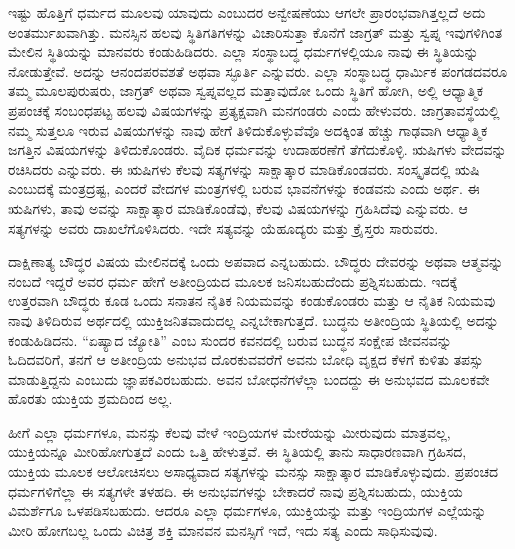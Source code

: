 ಇಷ್ಟು ಹೊತ್ತಿಗೆ ಧರ್ಮದ ಮೂಲವು ಯಾವುದು ಎಂಬುದರ ಅನ್ವೇಷಣೆಯು ಆಗಲೇ ಪ್ರಾರಂಭವಾಗಿತ್ತಲ್ಲದೆ ಅದು ಅಂತರ್ಮುಖವಾಗಿತ್ತು. ಮನಸ್ಸಿನ ಹಲವು ಸ್ಥಿತಿಗತಿಗಳನ್ನು ವಿಚಾರಿಸುತ್ತಾ ಕೊನೆಗೆ ಜಾಗ್ರತ್​ ಮತ್ತು ಸ್ವಪ್ನ ಇವುಗಳಿಗಿಂತ ಮೇಲಿನ ಸ್ಥಿತಿಯನ್ನು ಮಾನವರು ಕಂಡುಹಿಡಿದರು. ಎಲ್ಲಾ ಸಂಸ್ಥಾಬದ್ಧ ಧರ್ಮಗಳಲ್ಲಿಯೂ ನಾವು ಈ ಸ್ಥಿತಿಯನ್ನು ನೋಡುತ್ತೇವೆ. ಅದನ್ನು ಆನಂದಪರವಶತೆ ಅಥವಾ ಸ್ಫೂರ್ತಿ ಎನ್ನುವರು. ಎಲ್ಲಾ ಸಂಸ್ಥಾಬದ್ಧ ಧಾರ್ಮಿಕ ಪಂಗಡದವರೂ ತಮ್ಮ ಮೂಲಪುರುಷರು, ಜಾಗ್ರತ್​ ಅಥವಾ ಸ್ವಪ್ನವಲ್ಲದ ಮತ್ತಾವುದೋ ಒಂದು ಸ್ಥಿತಿಗೆ ಹೋಗಿ, ಅಲ್ಲಿ ಆಧ್ಯಾತ್ಮಿಕ ಪ್ರಪಂಚಕ್ಕೆ ಸಂಬಂಧಪಟ್ಟ ಹಲವು ವಿಷಯಗಳನ್ನು ಪ್ರತ್ಯಕ್ಷವಾಗಿ ಮನಗಂಡರು ಎಂದು ಹೇಳುವರು. ಜಾಗ್ರತಾವಸ್ಥೆಯಲ್ಲಿ ನಮ್ಮ ಸುತ್ತಲೂ ಇರುವ ವಿಷಯಗಳನ್ನು ನಾವು ಹೇಗೆ ತಿಳಿದುಕೊಳ್ಳುವೆವೊ ಅದಕ್ಕಿಂತ ಹೆಚ್ಚು ಗಾಢವಾಗಿ ಆಧ್ಯಾತ್ಮಿಕ ಜಗತ್ತಿನ ವಿಷಯಗಳನ್ನು ತಿಳಿದುಕೊಂಡರು. ವೈದಿಕ ಧರ್ಮವನ್ನು ಉದಾಹರಣೆಗೆ ತೆಗೆದುಕೊಳ್ಳಿ. ಋಷಿಗಳು ವೇದವನ್ನು ರಚಿಸಿದರು ಎನ್ನುವರು. ಈ ಋಷಿಗಳು ಕೆಲವು ಸತ್ಯಗಳನ್ನು ಸಾಕ್ಷಾತ್ಕಾರ ಮಾಡಿಕೊಂಡವರು. ಸಂಸ್ಕೃತದಲ್ಲಿ ಋಷಿ ಎಂಬುದಕ್ಕೆ ಮಂತ್ರದ್ರಷ್ಟ, ಎಂದರೆ ವೇದಗಳ ಮಂತ್ರಗಳಲ್ಲಿ ಬರುವ ಭಾವನೆಗಳನ್ನು ಕಂಡವನು ಎಂದು ಅರ್ಥ. ಈ ಋಷಿಗಳು, ತಾವು ಅವನ್ನು ಸಾಕ್ಷಾತ್ಕಾರ ಮಾಡಿಕೊಂಡೆವು, ಕೆಲವು ವಿಷಯಗಳನ್ನು ಗ್ರಹಿಸಿದೆವು ಎನ್ನುವರು. ಆ ಸತ್ಯಗಳನ್ನು ಅವರು ದಾಖಲೆಗೊಳಿಸಿದರು. ಇದೇ ಸತ್ಯವನ್ನು ಯೆಹೂದ್ಯರು ಮತ್ತು ಕ್ರೈಸ್ತರು ಸಾರುವರು.

ದಾಕ್ಷಿಣಾತ್ಯ ಬೌದ್ಧರ ವಿಷಯ ಮೇಲಿನದಕ್ಕೆ ಒಂದು ಅಪವಾದ ಎನ್ನಬಹುದು. ಬೌದ್ಧರು ದೇವರನ್ನು ಅಥವಾ ಆತ್ಮವನ್ನು ನಂಬದೆ ಇದ್ದರೆ ಅವರ ಧರ್ಮ ಹೇಗೆ ಅತೀಂದ್ರಿಯದ ಮೂಲಕ ಜನಿಸಬಹುದೆಂದು ಪ್ರಶ್ನಿಸಬಹುದು. ಇದಕ್ಕೆ ಉತ್ತರವಾಗಿ ಬೌದ್ಧರು ಕೂಡ ಒಂದು ಸನಾತನ ನೈತಿಕ ನಿಯಮವನ್ನು ಕಂಡುಕೊಂಡರು ಮತ್ತು ಆ ನೈತಿಕ ನಿಯಮವು ನಾವು ತಿಳಿದಿರುವ ಅರ್ಥದಲ್ಲಿ ಯುಕ್ತಿಜನಿತವಾದುದಲ್ಲ ಎನ್ನಬೇಕಾಗುತ್ತದೆ. ಬುದ್ಧನು ಅತೀಂದ್ರಿಯ ಸ್ಥಿತಿಯಲ್ಲಿ ಅದನ್ನು ಕಂಡುಹಿಡಿದನು. “ಏಷ್ಯಾದ ಜ್ಯೋತಿ” ಎಂಬ ಸುಂದರ ಕವನದಲ್ಲಿ ಬರುವ ಬುದ್ಧನ ಸಂಕ್ಷೇಪ ಜೀವನವನ್ನು ಓದಿದವರಿಗೆ, ತನಗೆ ಆ ಅತೀಂದ್ರಿಯ ಅನುಭವ ದೊರಕುವವರೆಗೆ ಅವನು ಬೋಧಿ ವೃಕ್ಷದ ಕೆಳಗೆ ಕುಳಿತು ತಪಸ್ಸು ಮಾಡುತ್ತಿದ್ದನು ಎಂಬುದು ಜ್ಞಾಪಕವಿರಬಹುದು. ಅವನ ಬೋಧನೆಗಳೆಲ್ಲಾ ಬಂದದ್ದು ಈ ಅನುಭವದ ಮೂಲಕವೇ ಹೊರತು ಯುಕ್ತಿಯ ಶ್ರಮದಿಂದ ಅಲ್ಲ.

ಹೀಗೆ ಎಲ್ಲಾ ಧರ್ಮಗಳೂ, ಮನಸ್ಸು ಕೆಲವು ವೇಳೆ ಇಂದ್ರಿಯಗಳ ಮೇರೆಯನ್ನು ಮೀರುವುದು ಮಾತ್ರವಲ್ಲ, ಯುಕ್ತಿಯನ್ನೂ ಮೀರಿಹೋಗುತ್ತದೆ ಎಂದು ಒತ್ತಿ ಹೇಳುತ್ತವೆ. ಈ ಸ್ಥಿತಿಯಲ್ಲಿ ತಾನು ಸಾಧಾರಣವಾಗಿ ಗ್ರಹಿಸದ, ಯುಕ್ತಿಯ ಮೂಲಕ ಆಲೋಚಿಸಲು ಅಸಾಧ್ಯವಾದ ಸತ್ಯಗಳನ್ನು ಮನಸ್ಸು ಸಾಕ್ಷಾತ್ಕಾರ ಮಾಡಿಕೊಳ್ಳುವುದು. ಪ್ರಪಂಚದ ಧರ್ಮಗಳಿಗೆಲ್ಲಾ ಈ ಸತ್ಯಗಳೇ ತಳಹದಿ. ಈ ಅನುಭವಗಳನ್ನು ಬೇಕಾದರೆ ನಾವು ಪ್ರಶ್ನಿಸಬಹುದು, ಯುಕ್ತಿಯ ವಿಮರ್ಶೆಗೂ ಒಳಪಡಿಸಬಹುದು. ಆದರೂ ಎಲ್ಲಾ ಧರ್ಮಗಳೂ, ಯುಕ್ತಿಯನ್ನು ಮತ್ತು ಇಂದ್ರಿಯಗಳ ಎಲ್ಲೆಯನ್ನು ಮೀರಿ ಹೋಗಬಲ್ಲ ಒಂದು ವಿಚಿತ್ರ ಶಕ್ತಿ ಮಾನವನ ಮನಸ್ಸಿಗೆ ಇದೆ, ಇದು ಸತ್ಯ ಎಂದು ಸಾಧಿಸುವುವು.

